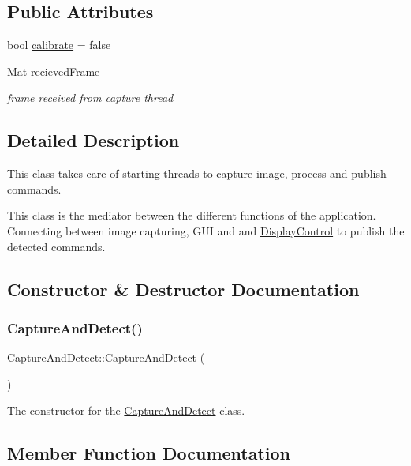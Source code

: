 \subsection*{Public Attributes}
\begin{DoxyCompactItemize}
\item 
bool \hyperlink{classCaptureAndDetect_ae57b827ebac2b4d5f5baaa8935442183}{calibrate} = false
\item 
Mat \hyperlink{classCaptureAndDetect_ad614571fedee59ecccccf0c14c3dd542}{recieved\+Frame}
\begin{DoxyCompactList}\small\item\em frame received from capture thread \end{DoxyCompactList}\end{DoxyCompactItemize}


\subsection{Detailed Description}
This class takes care of starting threads to capture image, process and publish commands. 

This class is the mediator between the different functions of the application. Connecting between image capturing, G\+UI and and \hyperlink{classDisplayControl}{Display\+Control} to publish the detected commands. 

\subsection{Constructor \& Destructor Documentation}
\mbox{\label{classCaptureAndDetect_a26c41eaa5100975ec0f50c97592f4bf1}} 
\subsubsection{\texorpdfstring{Capture\+And\+Detect()}{CaptureAndDetect()}}
{\footnotesize\ttfamily Capture\+And\+Detect\+::\+Capture\+And\+Detect (\begin{DoxyParamCaption}{ }\end{DoxyParamCaption})}

The constructor for the \hyperlink{classCaptureAndDetect}{Capture\+And\+Detect} class. 

\subsection{Member Function Documentation}
\mbox{\label{classCaptureAndDetect_af376ab5418f7b235ee181d574da71fd6}} 
